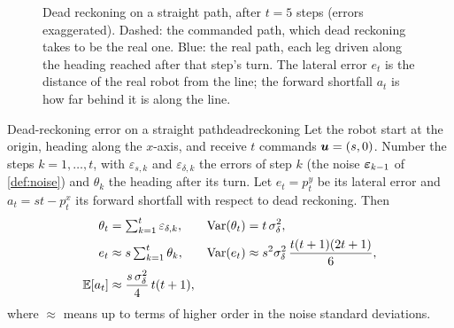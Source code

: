 \begin{figure}[ht]
\centering
{}
\caption{Dead reckoning on a straight path, after $t=5$ steps (errors
exaggerated). Dashed: the commanded path, which dead reckoning takes to
be the real one. Blue: the real path, each leg driven along the heading
reached after that step's turn. The lateral error $e_t$ is the distance of
the real robot from the line; the forward shortfall $a_t$ is how far
behind it is along the line.}
\label{fig:drsetup}
\end{figure}

\begin{proposition}{Dead-reckoning error on a straight path}{deadreckoning}
Let the robot start at the origin, heading along the $x$-axis, and receive
$t$ commands $\bm{u}=(s,0)$. Number the steps $k=1,\dots,t$, with
$\varepsilon_{s,k}$ and $\varepsilon_{\delta,k}$ the errors of step $k$
(the noise $\bm{\varepsilon}_{k-1}$ of \cref{def:noise}) and
$\theta_k$ the heading after its turn. Let $e_t=p^y_t$ be its lateral error and
$a_t=st-p^x_t$ its forward shortfall with respect to dead reckoning. Then
\begin{align}
  \theta_t&=\textstyle\sum_{k=1}^t\varepsilon_{\delta,k},
  & \operatorname{Var}(\theta_t)&=t\,\sigma_\delta^2,\label{eq:drheading}\\
  e_t&\approx s\textstyle\sum_{k=1}^t\theta_k,
  & \operatorname{Var}(e_t)&\approx s^2\sigma_\delta^2\,\frac{t(t+1)(2t+1)}{6},
  \label{eq:drlateral}\\
  \mathbb{E}[a_t]&\approx\frac{s\,\sigma_\delta^2}{4}\,t(t+1),
  \label{eq:drshort}
\end{align}
where $\approx$ means up to terms of higher order in the noise standard
deviations.
\end{proposition}

